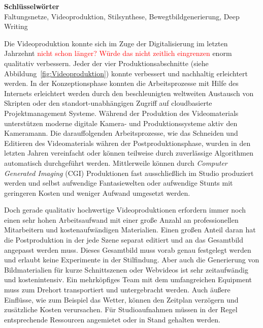 \documentclass[times, 11pt,twocolumn]{article}
\begin{document}
\large{\textbf{Schl\"usselw\"orter}}\\ \small %
 Faltungsnetze, Videoproduktion, Stilsynthese, Bewegtbildgenerierung, Deep Writing



 \label{sec:Einleitung}
Die Videoproduktion konnte sich im Zuge der Digitalisierung im letzten Jahrzehnt \textcolor{red}{nicht schon länger? Würde das nicht zeitlich eingrenzen} enorm qualitativ verbessern. Jeder der vier Produktionsabschnitte (siehe Abbildung~\ref{fig:Videoproduktion}) konnte verbessert und nachhaltig erleichtert werden. In der Konzeptionsphase konnten die Arbeitsprozesse mit Hilfe des Internets erleichtert werden durch den beschleunigten weltweiten Austausch von Skripten oder den standort-unabhängigen Zugriff auf cloudbasierte Projektmanagement Systeme. Während der Produktion des Videomaterials unterstützen moderne digitale Kamera- und Produktionssysteme aktiv den Kameramann. Die darauffolgenden Arbeitsprozesse, wie das Schneiden und Editieren des Videomaterials währen der Postproduktionsphase, wurden in den letzten Jahren vereinfacht oder können teilweise durch zuverlässige Algorithmen automatisch durchgeführt werden. Mittlerweile können durch \textit{Computer Generated Imaging} (CGI) Produktionen fast ausschließlich im Studio produziert werden und selbst aufwendige Fantasiewelten oder aufwendige Stunts mit geringeren Kosten und weniger Aufwand umgesetzt werden.

Doch gerade qualitativ hochwertige Videoproduktionen erfordern immer noch einen sehr hohen Arbeitsaufwand mit einer große Anzahl an professionellen Mitarbeitern und kostenaufwändigen Materialien. Einen großen Anteil daran hat die Postproduktion in der jede Szene separat editiert und an das Gesamtbild angepasst werden muss. Dieses Gesamtbild muss vorab genau festgelegt werden und erlaubt keine Experimente in der Stilfindung. Aber auch die Generierung von Bildmaterialien für kurze Schnittszenen oder Webvideos ist sehr zeitaufwändig und kostenintensiv. Ein mehrköpfiges Team mit dem umfangreichen Equipment muss zum Drehort transportiert und untergebracht werden. Auch äußere Einflüsse, wie zum Beispiel das Wetter, können den Zeitplan verzögern und zusätzliche Kosten verursachen. Für Studioaufnahmen müssen in der Regel entsprechende Ressourcen angemietet oder in Stand gehalten werden.
\end{document}
